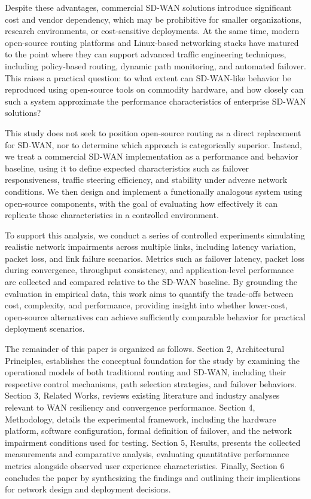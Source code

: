 \documentclass[conference]{IEEEtran}
\begin{document}
Despite these advantages, commercial SD-WAN solutions introduce significant cost and vendor dependency, which may be prohibitive for smaller organizations, research environments, or cost-sensitive deployments. At the same time, modern open-source routing platforms and Linux-based networking stacks have matured to the point where they can support advanced traffic engineering techniques, including policy-based routing, dynamic path monitoring, and automated failover. This raises a practical question: to what extent can SD-WAN-like behavior be reproduced using open-source tools on commodity hardware, and how closely can such a system approximate the performance characteristics of enterprise SD-WAN solutions?

This study does not seek to position open-source routing as a direct replacement for SD-WAN, nor to determine which approach is categorically superior. Instead, we treat a commercial SD-WAN implementation as a performance and behavior baseline, using it to define expected characteristics such as failover responsiveness, traffic steering efficiency, and stability under adverse network conditions. We then design and implement a functionally analogous system using open-source components, with the goal of evaluating how effectively it can replicate those characteristics in a controlled environment.

To support this analysis, we conduct a series of controlled experiments simulating realistic network impairments across multiple links, including latency variation, packet loss, and link failure scenarios. Metrics such as failover latency, packet loss during convergence, throughput consistency, and application-level performance are collected and compared relative to the SD-WAN baseline. By grounding the evaluation in empirical data, this work aims to quantify the trade-offs between cost, complexity, and performance, providing insight into whether lower-cost, open-source alternatives can achieve sufficiently comparable behavior for practical deployment scenarios.

The remainder of this paper is organized as follows. Section 2, Architectural Principles, establishes the conceptual foundation for the study by examining the operational models of both traditional routing and SD-WAN, including their respective control mechanisms, path selection strategies, and failover behaviors. Section 3, Related Works, reviews existing literature and industry analyses relevant to WAN resiliency and convergence performance. Section 4, Methodology, details the experimental framework, including the hardware platform, software configuration, formal definition of failover, and the network impairment conditions used for testing. Section 5, Results, presents the collected measurements and comparative analysis, evaluating quantitative performance metrics alongside observed user experience characteristics. Finally, Section 6 concludes the paper by synthesizing the findings and outlining their implications for network design and deployment decisions.
\end{document}
